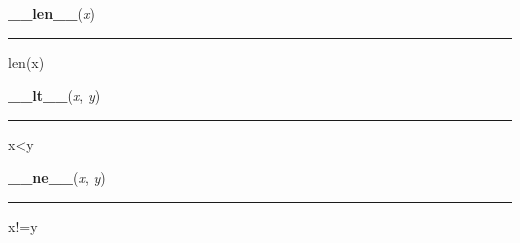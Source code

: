     \label{pygame:Rect:__len__}

    \vspace{0.5ex}

\hspace{.8\funcindent}\begin{boxedminipage}{\funcwidth}

    \raggedright \textbf{\_\_len\_\_}(\textit{x})

    \vspace{-1.5ex}

    \rule{\textwidth}{0.5\fboxrule}
\setlength{\parskip}{2ex}
    len(x)

\setlength{\parskip}{1ex}
    \end{boxedminipage}

    \label{pygame:Rect:__lt__}

    \vspace{0.5ex}

\hspace{.8\funcindent}\begin{boxedminipage}{\funcwidth}

    \raggedright \textbf{\_\_lt\_\_}(\textit{x}, \textit{y})

    \vspace{-1.5ex}

    \rule{\textwidth}{0.5\fboxrule}
\setlength{\parskip}{2ex}
    x{\textless}y

\setlength{\parskip}{1ex}
    \end{boxedminipage}

    \label{pygame:Rect:__ne__}

    \vspace{0.5ex}

\hspace{.8\funcindent}\begin{boxedminipage}{\funcwidth}

    \raggedright \textbf{\_\_ne\_\_}(\textit{x}, \textit{y})

    \vspace{-1.5ex}

    \rule{\textwidth}{0.5\fboxrule}
\setlength{\parskip}{2ex}
    x!=y

\setlength{\parskip}{1ex}
    \end{boxedminipage}

    \vspace{0.5ex}

